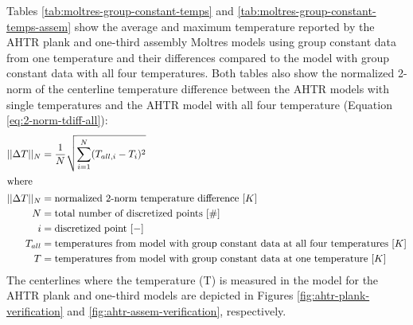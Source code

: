 Tables \ref{tab:moltres-group-constant-temps} and 
\ref{tab:moltres-group-constant-temps-assem}
show the average and maximum temperature reported by the \gls{AHTR} plank and one-third 
assembly Moltres models using group constant data from one temperature and their 
differences compared to the model with group constant data with all four temperatures. 
Both tables also show the normalized 2-norm of the centerline temperature difference 
between the \gls{AHTR} models with single temperatures and the \gls{AHTR} model with all four 
temperature (Equation \ref{eq:2-norm-tdiff-all}):
\begin{align}
    \label{eq:2-norm-tdiff-all}
    ||\Delta T||_N &= \frac{1}{N}\sqrt{\sum_{i=1}^N(T_{all, i} - T_{i})^2} \\
\intertext{where}
    ||\Delta T||_N &= \mbox{normalized 2-norm temperature difference } [K]\nonumber \\
    N &= \mbox{total number of discretized points } [\#] \nonumber \\
    i &= \mbox{discretized point } [-] \nonumber \\
    T_{all} &= \mbox{temperatures from model with group constant data at all four temperatures } [K] \nonumber \\
    T &= \mbox{temperatures from model with group constant data at one temperature } [K] \nonumber 
\end{align}
The centerlines where the temperature (T) is measured in the model for the \gls{AHTR} 
plank and one-third models are depicted in Figures \ref{fig:ahtr-plank-verification} 
and \ref{fig:ahtr-assem-verification}, respectively. 

